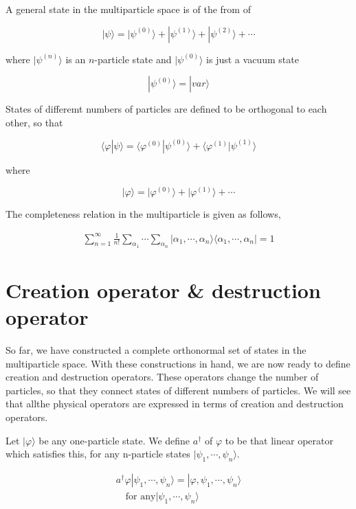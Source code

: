 ﻿\documentclass[twoside]{book}
\numberwithin{equation}{section}
\begin{document}
A general state in the multiparticle space is of the from of 

\[|\psi\rangle = |\psi^{(0)}\rangle + |\psi^{(1)}\rangle + |\psi^{(2)}\rangle + \cdots \]

where $|\psi^{(n)}\rangle$ is an $n$-particle state and $|\psi^{(0)}\rangle$ is just a vacuum state

\[|\psi^{(0)}\rangle = |var\rangle \]

States of differemt numbers of particles are defined to be orthogonal to each other, so that

\[\langle\varphi|\psi\rangle = \langle\varphi^{(0)}|\psi^{(0)}\rangle + \langle\varphi^{(1)}|\psi^{(1)}\rangle  \]

where

\[|\varphi\rangle = |\varphi^{(0)}\rangle + |\varphi^{(1)}\rangle + \cdots \]

The completeness relation in the multiparticle is given as follows, 

\begin{align}
\sum_{n=1}^{\infty}\frac{1}{n!}\sum_{\alpha_1}\cdots\sum_{\alpha_n}|\alpha_1,\cdots,\alpha_n\rangle\langle \alpha_1,\cdots,\alpha_n| = 1
\end{align}



\section{Creation operator \& destruction operator}

So far, we have constructed a complete orthonormal set of states in the multiparticle space. With these constructions in hand, we are now ready to define creation and destruction operators. These operators change the number of particles, so that they connect states of different numbers of particles. We will see that allthe physical operators are expressed in terms of creation and destruction operators. 

Let $|\varphi\rangle$ be any one-particle state. We define $a^\dagger$ of $\varphi$ to be that linear operator which satisfies this, for any n-particle states $|\psi_1, \cdots,\psi_n\rangle$. 

\begin{align}
a^\dagger{\varphi}|\psi_1,\cdots,\psi_n\rangle = |\varphi,\psi_1,\cdots,\psi_n\rangle \tag{e}\\
\quad\text{for any}|\psi_1,\cdots,\psi_n\rangle \label{Eqs1.6.1}
\end{align}
\end{document}
